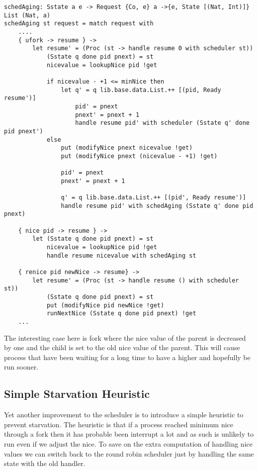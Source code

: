 \documentclass[logo,bsc,singlespacing,parskip]{infthesis}
\begin{document}
\begin{lstlisting}[language=unison]
schedAging: Sstate a e -> Request {Co, e} a ->{e, State [(Nat, Int)]} List (Nat, a)
schedAging st request = match request with
    ....
    { ufork -> resume } ->
        let resume' = (Proc (st -> handle resume 0 with scheduler st))
            (Sstate q done pid pnext) = st
            nicevalue = lookupNice pid !get

            if nicevalue - +1 <= minNice then
                let q' = q lib.base.data.List.++ [(pid, Ready resume')]
                    pid' = pnext
                    pnext' = pnext + 1
                    handle resume pid' with scheduler (Sstate q' done pid pnext')
            else
                put (modifyNice pnext nicevalue !get)
                put (modifyNice pnext (nicevalue - +1) !get)

                pid' = pnext
                pnext' = pnext + 1

                q' = q lib.base.data.List.++ [(pid', Ready resume')]
                handle resume pid' with schedAging (Sstate q' done pid pnext)

    { nice pid -> resume } ->
        let (Sstate q done pid pnext) = st
            nicevalue = lookupNice pid !get
            handle resume nicevalue with schedAging st

    { renice pid newNice -> resume} -> 
        let resume' = (Proc (st -> handle resume () with scheduler st))
            (Sstate q done pid pnext) = st
            put (modifyNice pid newNice !get)
            runNextNice (Sstate q done pid pnext) !get
    ...
\end{lstlisting}

The interesting case here is fork where the nice value of the parent is
decreased by one and the child is set to the old nice value of the parent. This
will cause process that have been waiting for a long time to have a higher and
hopefully be run sooner.

\subsection{Simple Starvation Heuristic}

Yet another improvement to the scheduler is to introduce a simple heuristic to
prevent starvation. The heuristic is that if a process reached minimum nice
through a fork then it has probable been interrupt a lot and as such is
unlikely to run even if we adjust the nice. To save on the extra computation of
handling nice values we can switch back to the round robin scheduler just by
handling the same state with the old handler.
\end{document}
